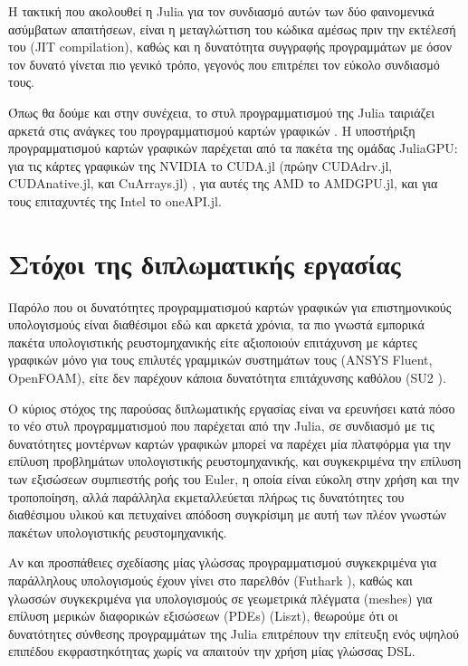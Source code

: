 Η τακτική που ακολουθεί η Julia για τον συνδιασμό αυτών των δύο φαινομενικά ασύμβατων απαιτήσεων, είναι η μεταγλώττιση του κώδικα αμέσως πριν την εκτέλεσή του (JIT compilation), καθώς και η δυνατότητα συγγραφής προγραμμάτων με όσον τον δυνατό γίνεται πιο γενικό τρόπο, γεγονός που επιτρέπει τον εύκολο συνδιασμό τους.

Όπως θα δούμε και στην συνέχεια, το στυλ προγραμματισμού της Julia ταιριάζει αρκετά στις ανάγκες του προγραμματισμού καρτών γραφικών \cite{Besard2019}.
Η υποστήριξη προγραμματισμού καρτών γραφικών παρέχεται από τα πακέτα της ομάδας JuliaGPU: για τις κάρτες γραφικών της NVIDIA το CUDA.jl (πρώην CUDAdrv.jl, CUDAnative.jl, και CuArrays.jl) \cite{Besard2018}, για αυτές της AMD το AMDGPU.jl, και για τους επιταχυντές της Intel το oneAPI.jl.

\section{Στόχοι της διπλωματικής εργασίας}

Παρόλο που οι δυνατότητες προγραμματισμού καρτών γραφικών για επιστημονικούς υπολογισμούς είναι διαθέσιμοι εδώ και αρκετά χρόνια, τα πιο γνωστά εμπορικά πακέτα υπολογιστικής ρευστομηχανικής είτε αξιοποιούν επιτάχυνση με κάρτες γραφικών μόνο για τους επιλυτές γραμμικών συστημάτων τους (ANSYS Fluent, OpenFOAM), είτε δεν παρέχουν κάποια δυνατότητα επιτάχυνσης καθόλου (SU2 \cite{Palacios2013}).

Ο κύριος στόχος της παρούσας διπλωματικής εργασίας είναι να ερευνήσει κατά πόσο το νέο στυλ προγραμματισμού που παρέχεται από την Julia, σε συνδιασμό με τις δυνατότητες μοντέρνων καρτών γραφικών μπορεί να παρέχει μία πλατφόρμα για την επίλυση προβλημάτων υπολογιστικής ρευστομηχανικής, και συγκεκριμένα την επίλυση των εξισώσεων συμπιεστής ροής του Euler, η οποία είναι εύκολη στην χρήση και την τροποποίηση, αλλά παράλληλα εκμεταλλεύεται πλήρως τις δυνατότητες του διαθέσιμου υλικού και πετυχαίνει απόδοση συγκρίσιμη με αυτή των πλέον γνωστών πακέτων υπολογιστικής ρευστομηχανικής.

Αν και προσπάθειες σχεδίασης μίας γλώσσας προγραμματισμού συγκεκριμένα για παράλληλους υπολογισμούς έχουν γίνει στο παρελθόν (Futhark \cite{Henriksen2017}), καθώς και γλωσσών συγκεκριμένα για υπολογισμούς σε γεωμετρικά πλέγματα (meshes) για επίλυση μερικών διαφορικών εξισώσεων (PDEs) (Liszt), θεωρούμε ότι οι δυνατότητες σύνθεσης προγραμμάτων της Julia επιτρέπουν την επίτευξη ενός υψηλού επιπέδου εκφραστηκότητας χωρίς να απαιτούν την χρήση μίας γλώσσας DSL.

